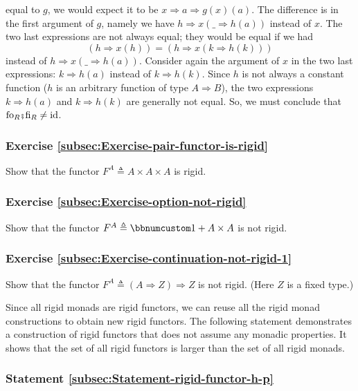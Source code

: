 equal to $g$, we would expect it to be $x\Rightarrow a\Rightarrow g(x)(a)$.
The difference is in the first argument of $g$, namely we have $h\Rightarrow x(\_\Rightarrow h(a))$
instead of $x$. The two last expressions are not always equal; they
would be equal if we had 
\[
\left(h\Rightarrow x(h)\right)=\left(h\Rightarrow x(k\Rightarrow h(k))\right)
\]
instead of $h\Rightarrow x(\_\Rightarrow h(a))$. Consider again the
argument of $x$ in the two last expressions: $k\Rightarrow h(a)$
instead of $k\Rightarrow h(k)$. Since $h$ is not always a constant
function ($h$ is an arbitrary function of type $A\Rightarrow B$),
the two expressions $k\Rightarrow h(a)$ and $k\Rightarrow h(k)$
are generally not equal. So, we must conclude that $\text{fo}_{R}\bef\text{fi}_{R}\neq\text{id}$.

\subsubsection{Exercise \label{subsec:Exercise-pair-functor-is-rigid}\ref{subsec:Exercise-pair-functor-is-rigid}}

Show that the functor $F^{A}\triangleq A\times A\times A$ is rigid.

\subsubsection{Exercise \label{subsec:Exercise-option-not-rigid}\ref{subsec:Exercise-option-not-rigid}}

Show that the functor $F^{A}\triangleq\bbnum 1+A\times A$ is not
rigid.

\subsubsection{Exercise \label{subsec:Exercise-continuation-not-rigid-1}\ref{subsec:Exercise-continuation-not-rigid-1}}

Show that the functor $F^{A}\triangleq\left(A\Rightarrow Z\right)\Rightarrow Z$
is not rigid. (Here $Z$ is a fixed type.)

Since all rigid monads are rigid functors, we can reuse all the rigid
monad constructions to obtain new rigid functors. The following statement
demonstrates a construction of rigid functors that does not assume
any monadic properties. It shows that the set of all rigid functors
is larger than the set of all rigid monads.

\subsubsection{Statement \label{subsec:Statement-rigid-functor-h-p}\ref{subsec:Statement-rigid-functor-h-p}}

